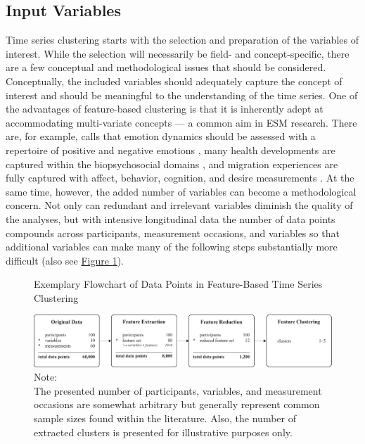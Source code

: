 \documentclass[man, 12pt, a4paper, floatsintext]{apa7}
\theoremstyle{break}
\theoremstyle{plain}
\newcommand{\fgrref}[2][]{\hyperref[#2]{Figure \ref*{#2}#1}}
\begin{document}
\subsection{Input Variables}
Time series clustering starts with the selection and preparation of the variables of interest. While the selection will necessarily be field- and concept-specific, there are a few conceptual and methodological issues that should be considered. Conceptually, the included variables should adequately capture the concept of interest and should be meaningful to the understanding of the time series. One of the advantages of feature-based clustering is that it is inherently adept at accommodating multi-variate concepts --- a common aim in ESM research. There are, for example, calls that emotion dynamics should be assessed with a repertoire of positive and negative emotions \citep[e.g.,][]{dejonckheere2019}, many health developments are captured within the biopsychosocial domains \citep[e.g.,][]{suls2004}, and migration experiences are fully captured with affect, behavior, cognition, and desire measurements \citep[e.g.,][]{Kreienkamp2022d}. At the same time, however, the added number of variables can become a methodological concern. Not only can redundant and irrelevant variables diminish the quality of the analyses, but with intensive longitudinal data the number of data points compounds across participants, measurement occasions, and variables so that additional variables can make many of the following steps substantially more difficult (also see \fgrref{fig:TSCFlowN}). 

\begin{figure}[!ht] %
  \caption{Exemplary Flowchart of Data Points in Feature-Based Time Series Clustering}
  \label{fig:TSCFlowN}
  \centering\includegraphics[width=\textwidth]{figures/TS Cluster Flow/tsClustFlowN.pdf}
  \caption*{Note: \\
  The presented number of participants, variables, and measurement occasions are somewhat arbitrary but generally represent common sample sizes found within the literature. Also, the number of extracted clusters is presented for illustrative purposes only.}
\end{figure}
\end{document}
